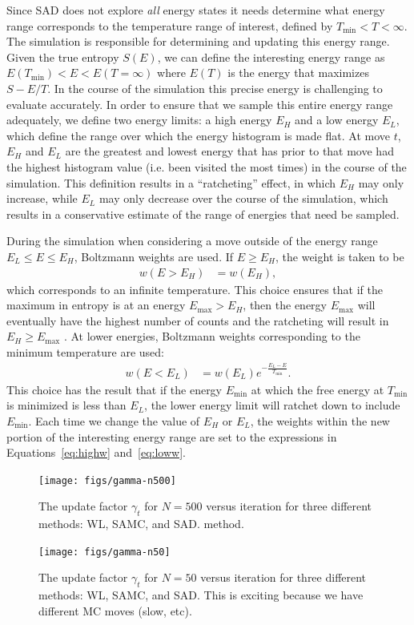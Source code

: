 \documentclass[letterpaper,twocolumn,amsmath,amssymb,pre,aps,10pt]{revtex4-1}
\begin{document}
Since SAD does not explore \emph{all} energy states it needs determine
what energy range corresponds to the temperature range of interest,
defined by $T_{\min}<T<\infty$.
The
simulation is responsible for determining and updating this energy
range.
Given the true entropy $S(E)$, we can define the interesting energy
range as
  $E(T_{\min}) <E< E(T=\infty)$
where $E(T)$ is the energy that maximizes $S-E/T$.  In the course of the
simulation this precise energy is challenging to evaluate accurately.
In order to ensure that we sample this entire energy range adequately,
we define two energy limits:  a high energy $E_H$ and a low
energy $E_L$, which define the range over which the energy histogram
is made flat. At move $t$, $E_H$ and $E_L$ are the greatest and lowest
energy that has prior to that move
had the highest histogram value (i.e. been visited the most times) in
the course of the simulation.
This definition results in a ``ratcheting'' effect, in which $E_H$
may only increase, while $E_L$ may only decrease over the course of the
simulation, which results in a conservative estimate of the range of
energies that need be sampled.

During the simulation when considering a move outside of the energy
range $E_L \le E \le E_H$, Boltzmann weights are used.  If $E\ge E_H$,
the weight is taken to be
\begin{align}\label{eq:highw}
  w(E>E_H) &= w(E_H),
\end{align}
which corresponds to an infinite temperature.
This choice ensures that
if the maximum in entropy is at an energy $E_{\max}>E_H$, then the energy
$E_{\max}$
will eventually have the highest number of counts and the ratcheting will
result in $E_H\ge E_{\max}$ .
At lower energies, Boltzmann weights corresponding to the minimum temperature
are used:
\begin{align}\label{eq:loww}
  w(E<E_L) &= w(E_L)e^{-\frac{E_L-E}{T_{\min}}}.
\end{align}
This choice has the result that if the energy $E_{\min}$ at which the free
energy at $T_{\min}$ is minimized is less than $E_L$, the lower energy
limit will ratchet down to include $E_{\min}$.
Each time we change the value of $E_H$ or $E_L$, the weights within the
new portion of the interesting energy range are set to the expressions
in Equations~\ref{eq:highw} and~\ref{eq:loww}.  

\begin{figure}
  \texttt{[image: figs/gamma-n500]}
  \caption{The update factor $\gamma_t$ for $N=500$ versus iteration for three
    different methods: WL, SAMC, and SAD.
    method.}\label{fig:gamma-vs-t}
\end{figure}
\begin{figure}
  \texttt{[image: figs/gamma-n50]}
  \caption{The update factor $\gamma_t$ for $N=50$ versus iteration for three
    different methods: WL, SAMC, and SAD.  This is exciting because we
    have different MC moves (slow, etc).}
\end{figure}
\end{document}
